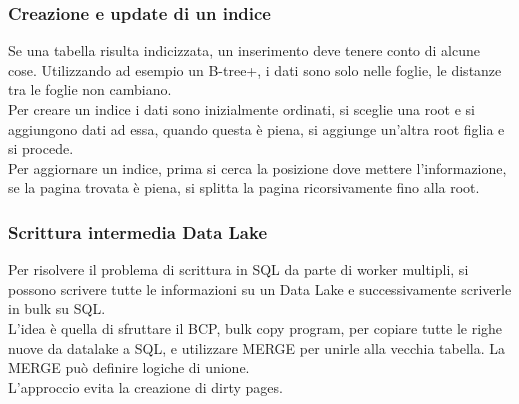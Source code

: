 \subsubsection{Creazione e update di un indice}
Se una tabella risulta indicizzata, un inserimento deve tenere conto 
di alcune cose.
Utilizzando ad esempio un B-tree+, i dati sono solo nelle foglie, le distanze tra le 
foglie non cambiano.\\
Per creare un indice i dati sono inizialmente ordinati, si sceglie una root e si 
aggiungono dati ad essa, quando questa è piena, si aggiunge un'altra root figlia e si procede.\\
Per aggiornare un indice, prima si cerca la posizione dove mettere l'informazione, 
se la pagina trovata è piena, si splitta la pagina ricorsivamente fino alla root.

\subsubsection{Scrittura intermedia Data Lake}
Per risolvere il problema di scrittura in SQL da parte di worker multipli, si possono 
scrivere tutte le informazioni su un Data Lake e successivamente scriverle in bulk su SQL.\\
L'idea è quella di sfruttare il BCP, bulk copy program, per copiare tutte le righe nuove 
da datalake a SQL, e utilizzare MERGE per unirle alla vecchia tabella. La MERGE può definire 
logiche di unione.\\
L'approccio evita la creazione di dirty pages.